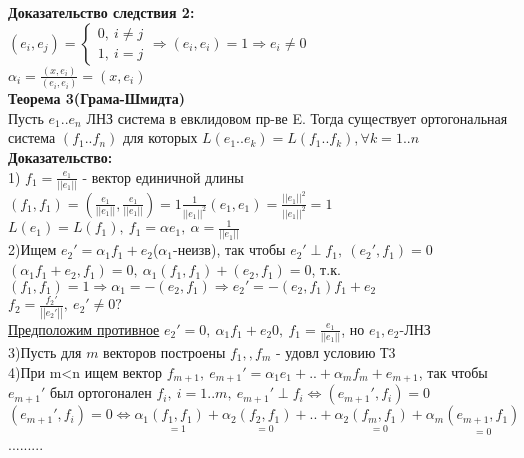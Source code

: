 \textbf{Доказательство следствия 2:} \\
$(e_i,e_j)=\left\{ \begin{matrix}
\mbox{$0, \ i \ne j $} \\
\mbox{$1, \ i=j$}
\end{matrix}\right. \Rightarrow (e_i,e_i)=1 \Rightarrow e_i \ne 0 $ \\
$\alpha_i = \frac{(x,e_i)}{(e_i,e_i)}=(x,e_i)$ \\
\textbf{Теорема 3(Грама-Шмидта)} \\
Пусть $e_1..e_n$ ЛНЗ система в евклидовом пр-ве E. Тогда существует ортогональная система $(f_1..f_n)$ для которых 
$L(e_1..e_k)=L(f_1..f_k), \forall k =1..n$ \\
\textbf{Доказательство:} \\
1) $f_1=\frac{e_1}{\left| \left| e_1 \right| \right|}$ - вектор единичной длины \\
$(f_1,f_1)=\left(\frac{e_1}{\left| \left| e_1 \right| \right|},\frac{e_1}{\left| \left| e_1 \right| \right|} \right) = 1 \frac{1}{\left| \left| e_1 \right| \right|^2}(e_1,e_1)=
\frac{\left| \left| e_1 \right| \right|^2}{\left| \left| e_1 \right| \right|^2} = 1$ \\
$L(e_1)=L(f_1), \ f_1=\alpha e_1 , \ \alpha = \frac{1}{\left| \left| e_1 \right| \right|}$ \\
2)Ищем $e_2'=\alpha_1 f_1 + e_2$($\alpha_1$-неизв), так чтобы $e_2' \perp f_1, \ (e_2',f_1)=0$ \\
$(\alpha_1 f_1 + e_2,f_1)=0, \ \alpha_1(f_1,f_1)+(e_2,f_1)=0$, т.к. $(f_1,f_1)=1 \Rightarrow \alpha_1=-(e_2,f_1) \Rightarrow e_2'=-(e_2,f_1)f_1+e_2$ \\
$f_2=\frac{f_2'}{\left| \left| e_2' \right| \right|}, \ e_2' \ne 0 ?$ \\
\underline{Предположим противное} $e_2'=0, \ \alpha_1 f_1 + e_2 0 , \ f_1=\frac{e_1}{\left| \left| e_1 \right| \right|}$, но $e_1,e_2$-ЛНЗ \\
3)Пусть для $m$ векторов построены $f_1,,f_m$ - удовл условию Т3 \\
4)При m<n ищем вектор $f_{m+1}, \ e_{m+1}' = \alpha_1 e_1 + .. + \alpha_m f_m + e_{m+1}$, так чтобы $e_{m+1}'$ был ортогонален $f_i, \ i=1..m, \ 
e_{m+1}' \perp f_i \Leftrightarrow (e_{m+1}',f_i)=0$ \\
$(e_{m+1}',f_i)=0 \Leftrightarrow \alpha_1 \underset {=1} {(f_1,f_1)} + \alpha_2 \underset {=0} {(f_2,f_1)} + .. + \alpha_2 \underset {=0} {(f_m,f_1)} + \alpha_m \underset {=0} {(e_{m+1},f_1)}$ \\
.........\\
